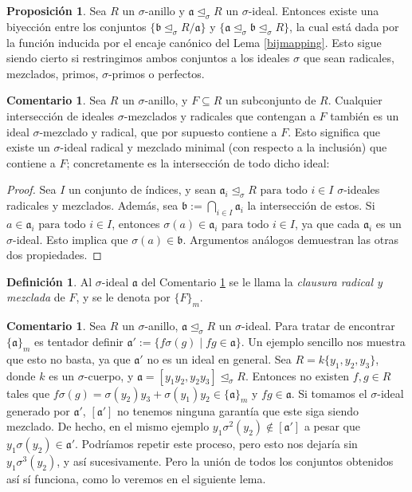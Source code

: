 \documentclass[letterpaper]{article}
\def\fa{\text{ para todo }}
\def\a{\mathfrak{a}}
\def\b{\mathfrak{b}}
\def\s{\sigma}
\def\si{\unlhd_{\sigma}}
\newenvironment{bew}{\begin{proof}[Proof]}{\end{proof}}
\theoremstyle{definition}
\newtheorem{prop}[Satz]{Proposici\'{o}n}
\newtheorem{rem}[Satz]{Comentario}
\newtheorem{defn}[Satz]{Definici\'on}
\begin{document}
\begin{prop}\label{bijideals}
Sea $R$ un $\sigma$-anillo y $\a \si R$ un $\sigma$-ideal. Entonces existe una biyecci\'on entre los conjuntos $\{ \b \si R/\a \}$ y $\{ \a \si \b \si R \}$, la cual est\'a dada por la funci\'on inducida por el encaje can\'onico del Lema \ref{bijmapping}. 
Esto sigue siendo cierto si restringimos ambos conjuntos a los ideales $\s$ que sean radicales, mezclados, primos, $\sigma$-primos o perfectos.
\end{prop}

\begin{rem}\label{wmwelldef}
Sea $R$ un $\sigma$-anillo, y $F \subseteq R$ un subconjunto de $R$. Cualquier intersecci\'on de ideales $\sigma$-mezclados y radicales que contengan a $F$ tambi\'en es un ideal $\sigma$-mezclado y radical, que por supuesto contiene a $F$. 
Esto significa que existe un $\sigma$-ideal radical y mezclado minimal (con respecto a la inclusi\'on) que contiene a $F$; concretamente es la intersecci\'on de todo dicho ideal:
\begin{proof}
Sea $I$ un conjunto de \'indices, y sean $\a_i \si R \fa i \in I$ $\sigma$-ideales radicales y mezclados. Adem\'as, sea $\b := \bigcap_{i \in I} \a_i$ la intersecci\'on de estos. Si $a \in \a_i \fa i \in I$, entonces $\s(a) \in \a_i \fa i \in I$, ya que cada $\a_i$ es un $\sigma$-ideal.
Esto implica que $\sigma(a) \in \b$. Argumentos an\'alogos demuestran las otras dos propiedades.
\end{proof}
\end{rem}

\begin{defn}
Al $\sigma$-ideal $\a$ del Comentario \ref{wmwelldef} se le llama la \emph{clausura radical y mezclada} de $F$, y se le denota por $\{F\}_{m}$.
\end{defn}

\begin{rem}\label{remshuffling}
Sea $R$ un $\sigma$-anillo, $\a \si R$ un $\sigma$-ideal. Para tratar de encontrar $\{\a\}_m$ es tentador definir $\a':= \{ f\s(g) \mid fg \in \a \}$. Un ejemplo sencillo nos muestra que esto no basta, ya que $\a'$ no es un ideal en general.
Sea $R=k\{y_1,y_2,y_3\}$, donde $k$ es un $\sigma$-cuerpo, y $\a = [y_1y_2, y_2y_3] \si R$. Entonces no existen $f,g \in R$ tales que $ f \s(g) = \s(y_2)y_3 + \s(y_1)y_2 \in \{\a\}_m$ y $fg \in \a$. 
Si tomamos el $\sigma$-ideal generado por $\a'$, $[\a']$ no tenemos ninguna garant\'ia que este siga siendo mezclado. De hecho, en el mismo ejemplo $y_1\s^2(y_2) \notin [\a']$ a pesar que $y_1 \s(y_2) \in \a'$. 
Podr\'iamos repetir este proceso, pero esto nos dejar\'ia sin $y_1 \s^3(y_2)$, y as\'i sucesivamente. Pero la uni\'on de todos los conjuntos obtenidos as\'i s\'i funciona, como lo veremos en el siguiente lema.
\end{rem}
\end{document}
